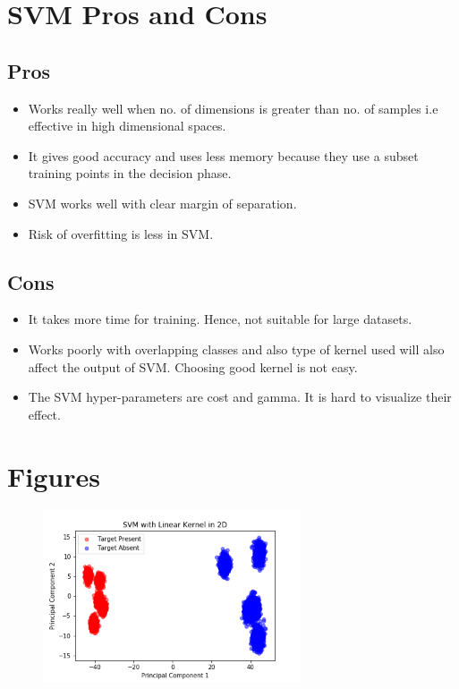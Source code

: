 \documentclass[journal,12pt,twocolumn]{IEEEtran}
\begin{document}
\section{SVM Pros and Cons}
\subsection{Pros}
\begin{itemize}
\item Works really well when no. of dimensions is greater than no. of samples i.e effective in high dimensional spaces.
\item It gives good accuracy and uses less memory because they use a subset training points in the decision phase.
\item SVM works well with clear margin of separation.
\item Risk of overfitting is less in SVM.
\end{itemize}


\subsection{Cons}
\begin{itemize}
\item It takes more time for training. Hence, not suitable for large datasets.
\item Works poorly with overlapping classes and also type of kernel used will also affect the output of SVM. Choosing good kernel is not easy.
\item The SVM hyper-parameters are cost and gamma. It is hard to visualize their effect.
\end{itemize}

\section{Figures}
\begin{figure}[!h]
\begin{center}
\includegraphics[width=3in]{figs/LinSVM_2D.png}
\end{center}
\caption{}
\label{fig: 2D Plot}
\end{figure}
\end{document}
